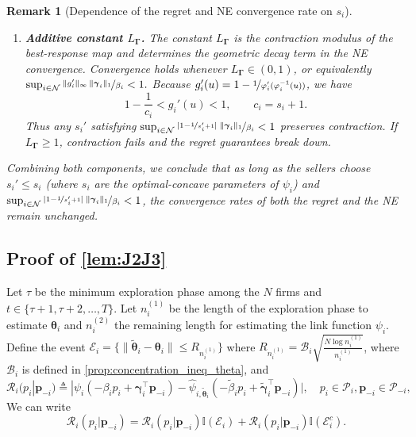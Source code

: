 \documentclass{article} %
\newtheorem{remark}[theorem]{Remark}
\begin{document}
\begin{remark}[Dependence of the regret and NE convergence rate on $s_i$]
\begin{enumerate}[leftmargin=*, label=(\arabic*)]
\item \textbf{Additive constant $L_{\boldsymbol{\Gamma}}$.}  
The constant $L_{\boldsymbol{\Gamma}}$ is the contraction modulus of the best-response map and determines the geometric decay term in the NE convergence. Convergence holds whenever $L_{\boldsymbol{\Gamma}} \in (0,1)$, or equivalently $\sup_{i\in\mathcal{N}}
\nicefrac{\|g_i'\|_\infty\,\|\boldsymbol{\gamma}_i\|_1}{\beta_i} < 1.$ Because $g_i'(u)=1-\nicefrac{1}{\varphi_i'(\varphi_i^{-1}(u))}$, we have
\[
1-\frac{1}{c_i}<g_i'(u)<1,
\qquad c_i=s_i+1.
\]
Thus any $s_i'$ satisfying $\sup_{i\in\mathcal{N}}
\nicefrac{|1-\nicefrac{1}{s_i'+1}|\;\|\boldsymbol{\gamma}_i\|_1}{\beta_i} < 1$ preserves contraction. If $L_{\boldsymbol{\Gamma}} \ge 1$, contraction fails and the regret guarantees break down.
\end{enumerate}

Combining both components, we conclude that as long as the sellers choose $s_i' \le s_i$ (where $s_i$ are the optimal-concave parameters of $\psi_i$) and $\sup_{i\in\mathcal{N}}
\nicefrac{|1-\nicefrac{1}{s_i'+1}|\;\|\boldsymbol{\gamma}_i\|_1}{\beta_i} < 1$, the convergence rates of both the regret and the NE remain unchanged.

\end{remark}




\subsection{Proof of \cref{lem:J2J3}}
Let $\tau$ be the minimum exploration phase among the $N$ firms and $t \in \{\tau +1, \tau +2,\dots, T\}$. Let $n_i^{(1)}$ be the length of the exploration phase to estimate $\boldsymbol{\theta}_i$ and $n_i^{(2)}$ the remaining length for estimating the link function $\psi_i$. Define the event $\mathcal{E}_i = \{\|\widetilde{\boldsymbol{\theta}}_i-\boldsymbol{\theta}_i\|\leq R_{n_i^{(1)}}\}$ where $R_{n_i^{(1)}}= \mathscr{B}_i\sqrt{\frac{N\log n_i^{(1)}}{n_i^{(1)}}}$, where $\mathscr{B}_i$ is defined in \cref{prop:concentration_ineq_theta}, and 
$$
\mathscr{R}_i(p_i|\mathbf{p}_{-i}) \triangleq |\psi_i( -\beta_i p_i+\boldsymbol{\gamma}_i^{\top} \mathbf{p}_{-i})-\widehat{\psi}_{i,\widetilde{\boldsymbol{\theta}}_i}( -\widetilde{\beta}_i p_i+\widetilde{\boldsymbol{\gamma}}_i^{\top} \mathbf{p}_{-i})|, \quad p_i \in \mathcal{P}_i, \mathbf{p}_{-i} \in \mathcal{P}_{-i},
$$
We can write
$$
\mathscr{R}_i(p_i|\mathbf{p}_{-i}) = \mathscr{R}_i(p_i|\mathbf{p}_{-i})\mathbb{I}(\mathcal{E}_i)+\mathscr{R}_i(p_i|\mathbf{p}_{-i})\mathbb{I}(\mathcal{E}_i^c).
$$ 
\end{document}
